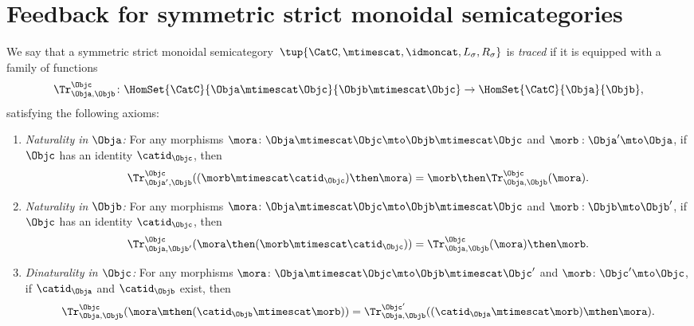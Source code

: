 \section{Feedback for symmetric strict monoidal semicategories}

\begin{ctdefinition}
    \label{def:traced-fun-stack-scat}
    We say that a symmetric strict monoidal semicategory~$\tup{\CatC,\mtimescat, \idmoncat, L_\sigma, R_\sigma}$ is \emph{traced} if it is equipped with a family of functions
    \begin{equation}
        \Tr_{\Obja,\Objb}^\Objc\colon \HomSet{\CatC}{\Obja \mtimescat \Objc}{\Objb\mtimescat \Objc}\to \HomSet{\CatC}{\Obja}{\Objb},
    \end{equation}
    satisfying the following axioms:
    \begin{enumerate}
    
        \item \emph{Naturality in $\Obja$:} For any morphisms $\mora\colon \Obja\mtimescat \Objc \mto \Objb\mtimescat \Objc$ and $\morb : \Obja' \mto \Obja$, if $\Objc$ has an identity $\catid_\Objc$, then
              \begin{equation}
                  \Tr_{\Obja', \Objb}^\Objc ( (\morb \mtimescat \catid_\Objc) \then \mora) = \morb \then \Tr_{\Obja, \Objb}^\Objc (\mora).
              \end{equation}
              
        \item \emph{Naturality in $\Objb$:}
              For any morphisms $\mora\colon \Obja\mtimescat \Objc \mto \Objb\mtimescat \Objc$ and $\morb : \Objb \mto \Objb'$, if $\Objc$ has an identity $\catid_\Objc$, then
              \begin{equation}
                  \Tr_{\Obja, \Objb'}^\Objc ( \mora \then (\morb \mtimescat \catid_\Objc) ) =  \Tr_{\Obja, \Objb}^\Objc (\mora) \then \morb.
              \end{equation}
              
              \item \emph{Dinaturality in $\Objc$:} For any morphisms $\mora \colon \Obja \mtimescat \Objc \mto \Objb \mtimescat \Objc'$ and $\morb \colon \Objc' \mto \Objc$, if $\catid_\Obja$ and $\catid_\Objb$ exist, then
        \begin{equation}
        \Tr_{\Obja, \Objb}^{\Objc} (\mora \mthen (\catid_\Objb \mtimescat \morb)) = \Tr_{\Obja, \Objb}^{\Objc'}((\catid_\Obja \mtimescat \morb) \mthen \mora).
        \end{equation}
              

\end{enumerate}
\end{ctdefinition}
